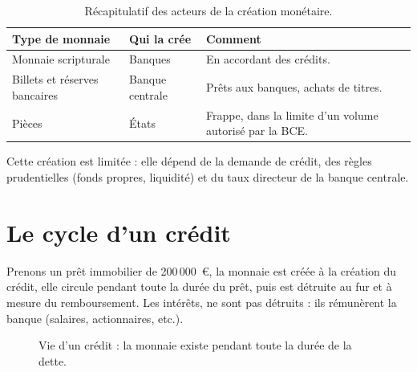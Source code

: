 \documentclass[11pt,a4paper]{article}
\begin{document}
\begin{table}[H]
\centering
\renewcommand{\arraystretch}{1.25}
\begin{tabular}{@{}p{4.6cm}p{3.6cm}p{6cm}@{}}
\toprule
\textbf{Type de monnaie} & \textbf{Qui la crée} & \textbf{Comment} \\
\midrule
Monnaie scripturale & Banques   & En accordant des crédits. \\
Billets et réserves bancaires & Banque centrale & Prêts aux banques, achats de titres. \\
Pièces & États & Frappe, dans la limite d'un volume autorisé par la BCE. \\
\bottomrule
\end{tabular}
\caption{Récapitulatif des acteurs de la création monétaire.}
\end{table}

Cette création est limitée : elle dépend de la demande de crédit, des règles prudentielles (fonds propres, liquidité) et du taux directeur de la banque centrale.

\section{Le cycle d'un crédit}

Prenons un prêt immobilier de 200\,000~\euro, la monnaie est créée à la création du crédit, elle circule pendant toute la durée du prêt, puis est détruite au fur et à mesure du remboursement. Les intérêts, ne sont pas détruits : ils rémunèrent la banque (salaires, actionnaires, etc.).

\begin{figure}[htbp]
\centering
{}
\caption{Vie d'un crédit : la monnaie existe pendant toute la durée de la dette.}
\label{fig:credit}
\end{figure}
\end{document}
